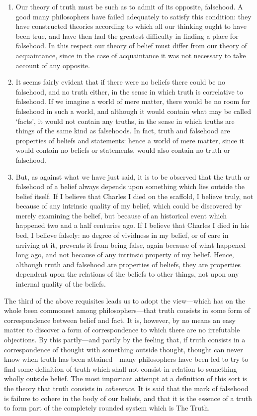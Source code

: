 \documentclass[oneside,letterpaper,12pt]{book}
\begin{document}
\begin{enumerate}
	\item Our theory of truth must be such as to admit of its opposite,
	falsehood. A good many philosophers have failed adequately to satisfy
	this condition: they have constructed theories according to which all
	our thinking ought to have been true, and have then had the greatest
	difficulty in finding a place for falsehood. In this respect our theory
	of belief must differ from our theory of acquaintance, since in the case
	of acquaintance it was not necessary to take account of any opposite.
	\item It seems fairly evident that if there were no beliefs there could be
	no falsehood, and no truth either, in the sense in which truth is
	correlative to falsehood. If we imagine a world of mere matter, there
	would be no room for falsehood in such a world, and although it would
	contain what may be called `facts', it
	would not contain any truths, in the sense in which truths are things of
	the same kind as falsehoods. In fact, truth and falsehood are properties
	of beliefs and statements: hence a world of mere matter, since it would
	contain no beliefs or statements, would also contain no truth or
	falsehood.
	\item But, as against what we have just said, it is to be observed that
	the truth or falsehood of a belief always depends upon something which
	lies outside the belief itself. If I believe that Charles I died on the
	scaffold, I believe truly, not because of any intrinsic quality of my
	belief, which could be discovered by merely examining the belief, but
	because of an historical event which happened two and a half centuries
	ago. If I believe that Charles I died in his bed, I believe falsely: no
	degree of vividness in my belief, or of care in arriving at it, prevents
	it from being false, again because of what happened long ago, and not
	because of any intrinsic property of my belief. Hence, although truth
	and falsehood are properties of beliefs, they are properties dependent
	upon the relations of the beliefs to other things, not upon any internal
	quality of the beliefs.
\end{enumerate}
The third of the above requisites leads us to adopt the view---which has
on the whole been commonest among philosophers---that truth consists in
some form of correspondence between belief and fact. It is, however, by
no means an easy matter to discover a form of correspondence to which
there are no irrefutable objections. By this partly---and partly by the
feeling that, if truth consists in a correspondence of thought with
something outside thought, thought can never know when truth has been
attained---many philosophers have been led to try to find some
definition of truth which shall not consist in relation to something
wholly outside belief. The most important attempt at a definition of
this sort is the theory that truth consists in \emph{coherence}. \label{coherence} It is
said that the mark of falsehood is failure to cohere in the body of our
beliefs, and that it is the essence of a truth to form part of the
completely rounded system which is The Truth.
\end{document}
